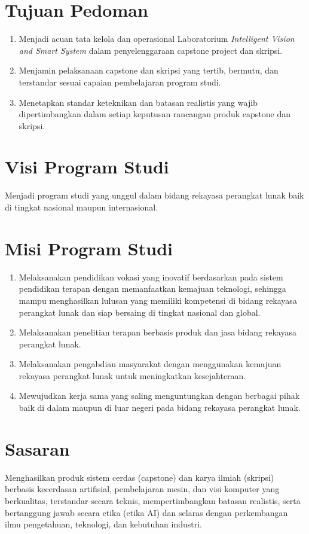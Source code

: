 \documentclass[12pt,a4paper]{report}
\begin{document}
\section{Tujuan Pedoman}
\begin{enumerate}
\item Menjadi acuan tata kelola dan operasional Laboratorium \emph{Intelligent Vision and Smart System} dalam penyelenggaraan capstone project dan skripsi.
\item Menjamin pelaksanaan capstone dan skripsi yang tertib, bermutu, dan terstandar sesuai capaian pembelajaran program studi.
\item Menetapkan standar keteknikan dan batasan realistis yang wajib dipertimbangkan dalam setiap keputusan rancangan produk capstone dan skripsi.
\end{enumerate}

\section{Visi Program Studi}
Menjadi program studi yang unggul dalam bidang rekayasa perangkat lunak baik di tingkat nasional maupun internasional.

\section{Misi Program Studi}
\begin{enumerate}
\item Melaksanakan pendidikan vokasi yang inovatif berdasarkan pada sistem pendidikan terapan dengan memanfaatkan kemajuan teknologi, sehingga mampu menghasilkan lulusan yang memiliki kompetensi di bidang re\-ka\-ya\-sa pe\-rang\-kat lu\-nak dan siap bersaing di tingkat nasional dan global.
\item Melaksanakan penelitian terapan berbasis produk dan jasa bidang rekayasa perangkat lunak.
\item Melaksanakan pengabdian masyarakat dengan menggunakan kemajuan rekayasa perangkat lunak untuk meningkatkan kesejahteraan.
\item Mewujudkan kerja sama yang saling menguntungkan dengan berbagai pihak baik di dalam maupun di luar negeri pada bidang rekayasa perangkat lunak.
\end{enumerate}

\section{Sasaran}
Menghasilkan produk sistem cerdas (capstone) dan karya ilmiah (skripsi) berbasis kecerdasan artifisial, pembelajaran mesin, dan visi komputer yang berkualitas, terstandar secara teknis, mempertimbangkan batasan realistis, serta bertanggung jawab secara etika (etika AI) dan selaras dengan perkembangan ilmu pengetahuan, teknologi, dan kebutuhan industri.
\end{document}
